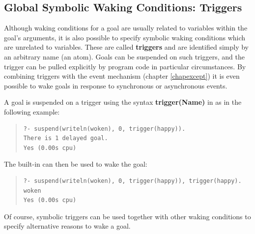 \subsection{Global Symbolic Waking Conditions: Triggers}
\label{trigger}

Although waking conditions for a goal are usually related to variables
within the goal's arguments, it is also possible to specify symbolic
waking conditions which are unrelated to variables.
%
These are called {\bf triggers} and are identified simply by an
arbitrary name (an atom). Goals can be suspended on such triggers,
and the trigger can be pulled explicitly by program code in
particular circumstances. By combining triggers with the event mechanism
(chapter \ref{chapexcept}) it is even possible to wake goals in
response to synchronous or asynchronous events.

A goal is suspended on a trigger using the syntax {\bf trigger(Name)}
in 
as in the following example:
\begin{quote}\begin{verbatim}
?- suspend(writeln(woken), 0, trigger(happy)).
There is 1 delayed goal.
Yes (0.00s cpu)
\end{verbatim}\end{quote}
The built-in
can then be used to wake the goal:
\begin{quote}\begin{verbatim}
?- suspend(writeln(woken), 0, trigger(happy)), trigger(happy).
woken
Yes (0.00s cpu)
\end{verbatim}\end{quote}
Of course, symbolic triggers can be used together with other
waking conditions to specify alternative reasons to wake a goal.



